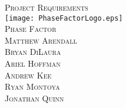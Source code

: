 \begin{titlepage}
\begin{center} 
\vspace*{2cm}
\textsc{\Huge Project Requirements}\\[4cm]


\texttt{[image: PhaseFactorLogo.eps]}\\[.5cm]
\textsc{\LARGE Phase Factor}\\[3cm]

\textsc{\large Matthew Arendall}\\[0.2cm]
\textsc{\large Bryan DiLaura} \\[0.2cm]
\textsc{\large Ariel Hoffman} \\[0.2cm]
\textsc{\large Andrew Kee} \\[0.2cm]
\textsc{\large Ryan Montoya} \\[0.2cm]
\textsc{\large Jonathan Quinn} \\[0.2cm]

\end{center}
\end{titlepage}